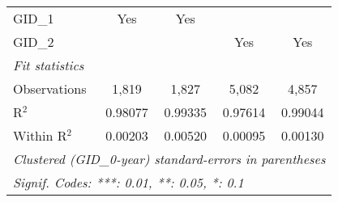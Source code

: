 \begin{tabular}{lcccc}
   GID\_1                                                 & Yes      & Yes                     &                & \\  
   GID\_2                                                 &          &                         & Yes            & Yes\\  
   \midrule
   \emph{Fit statistics}\\
   Observations                                           & 1,819    & 1,827                   & 5,082          & 4,857\\  
   R$^2$                                                  & 0.98077  & 0.99335                 & 0.97614        & 0.99044\\  
   Within R$^2$                                           & 0.00203  & 0.00520                 & 0.00095        & 0.00130\\  
   \midrule \midrule
   \multicolumn{5}{l}{\emph{Clustered (GID\_0-year) standard-errors in parentheses}}\\
   \multicolumn{5}{l}{\emph{Signif. Codes: ***: 0.01, **: 0.05, *: 0.1}}\\
\end{tabular}
\par\endgroup



